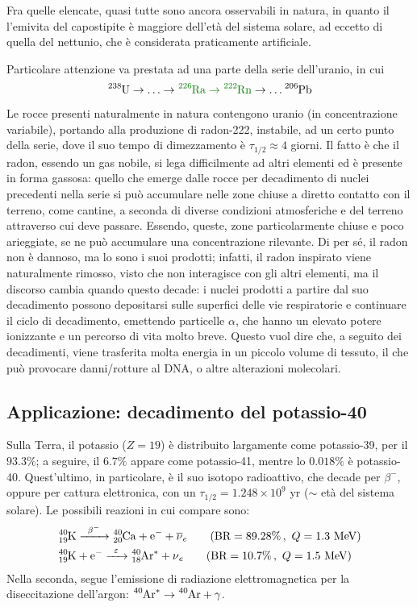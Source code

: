\documentclass[11pt, a4paper]{scrartcl}
\theoremstyle{style}
\numberwithin{equation}{subsection}
\begin{document}
\noindent Fra quelle elencate, quasi tutte sono ancora osservabili in natura, in quanto il l'emivita del capostipite \`e maggiore dell'et\`a del sistema solare, ad eccetto di quella del nettunio, che \`e considerata praticamente artificiale.

Particolare attenzione va prestata ad una parte della serie dell'uranio, in cui 
\[
	\ce{^{238}U} \to  \ldots \to  {\color{green!50!black}\ce{^{226}Ra} \to  \ce{^{222}Rn}} \to  \ldots \ce{^{206}Pb}
\] 
Le rocce presenti naturalmente in natura contengono uranio (in concentrazione variabile), portando alla produzione di radon-222, instabile, ad un certo punto della serie, dove il suo tempo di dimezzamento \`e $\tau _{1 / 2} \approx 4$ giorni.
Il fatto \`e che il radon, essendo un gas nobile, si lega difficilmente ad altri elementi ed \`e presente in forma gassosa: quello che emerge dalle rocce per decadimento di nuclei precedenti nella serie si pu\`o accumulare nelle zone chiuse a diretto contatto con il terreno, come cantine, a seconda di diverse condizioni atmosferiche e del terreno attraverso cui deve passare.
Essendo, queste, zone particolarmente chiuse e poco arieggiate, se ne pu\`o accumulare una concentrazione rilevante.
Di per s\'e, il radon non \`e dannoso, ma lo sono i suoi prodotti; infatti, il radon inspirato viene naturalmente rimosso, visto che non interagisce con gli altri elementi, ma il discorso cambia quando questo decade: i nuclei prodotti a partire dal suo decadimento possono depositarsi sulle superfici delle vie respiratorie e continuare il ciclo di decadimento, emettendo particelle $\alpha $, che hanno un elevato potere ionizzante e un percorso di vita molto breve. 
Questo vuol dire che, a seguito dei decadimenti, viene trasferita molta energia in un piccolo volume di tessuto, il che pu\`o provocare danni/rotture al DNA, o altre alterazioni molecolari.

\subsection{Applicazione: decadimento del potassio-40}
Sulla Terra, il potassio ($Z=19$) \`e distribuito largamente come potassio-39, per il $93.3\%$; a seguire, il $6.7\%$ appare come potassio-41, mentre lo $0.018\%$ \`e potassio-40.
Quest'ultimo, in particolare, \`e il suo isotopo radioattivo, che decade per $\beta ^-$, oppure per cattura elettronica, con un $\tau _{ 1 / 2} = 1.248 \times 10^{9}$ yr ($\sim$ et\`a del sistema solare).
Le possibili reazioni in cui compare sono:
\begin{align}
	&\ce{^{40}_{19}K} \xrightarrow{\ \, \beta ^- \ \,} \ce{_{20}^{40}Ca + e- + \overline{\nu }_e} \tag{$\text{BR}= 89.28\%\, , \ Q=1.3$ MeV} \\
	&\ce{^{40}_{19}K + e-} \xrightarrow{\ \, \varepsilon  \ \,} \ce{_{18}^{40}Ar^* + \nu _e}\tag{$\text{BR}= 10.7\%\, , \ Q=1.5$ MeV}
\end{align}
Nella seconda, segue l'emissione di radiazione elettromagnetica per la diseccitazione dell'argon: $\ce{^{40}Ar^*} \to \ce{^{40}Ar} + \gamma$.
\end{document}
